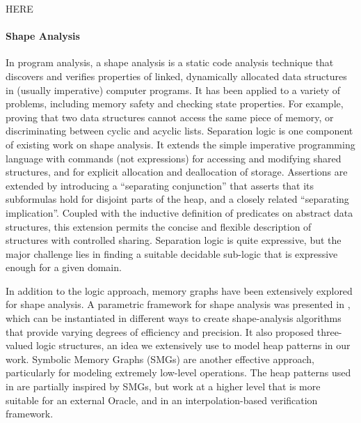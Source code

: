 HERE


\paragraph{Shape Analysis}
In program analysis, a shape analysis is a static code analysis technique that discovers
and verifies properties of linked, dynamically allocated data structures in (usually
imperative) computer programs. It has been applied to a variety of problems, including
memory safety and checking state properties. For example, proving that two data
structures cannot access the same piece of memory, or discriminating between cyclic and
acyclic lists. Separation logic \cite{calcagano11,reynolds02} is one component of
existing work on shape analysis. It extends the simple imperative programming language
with commands (not expressions) for accessing and modifying shared structures, and for
explicit allocation and deallocation of storage. Assertions are extended by introducing
a ``separating conjunction'' that asserts that its subformulas hold for disjoint parts
of the heap, and a closely related ``separating implication''. Coupled with the
inductive definition of predicates on abstract data structures, this extension permits
the concise and flexible description of structures with controlled sharing. Separation
logic is quite expressive, but the major challenge lies in finding a suitable decidable
sub-logic that is expressive enough for a given domain.

In addition to the logic approach, memory graphs have been extensively explored for
shape analysis. A parametric framework for shape analysis was presented in
\cite{sagiv02}, which can be instantiated in different ways to create shape-analysis
algorithms that provide varying degrees of efficiency and precision. It also proposed
three-valued logic structures, an idea we extensively use to model heap patterns in our
work. Symbolic Memory Graphs (SMGs) \cite{dudka13} are another effective approach,
particularly for modeling extremely low-level operations. The heap patterns used in
\verifier are partially inspired by SMGs, but work at a higher level that is more
suitable for an external Oracle, and in an interpolation-based verification framework.

